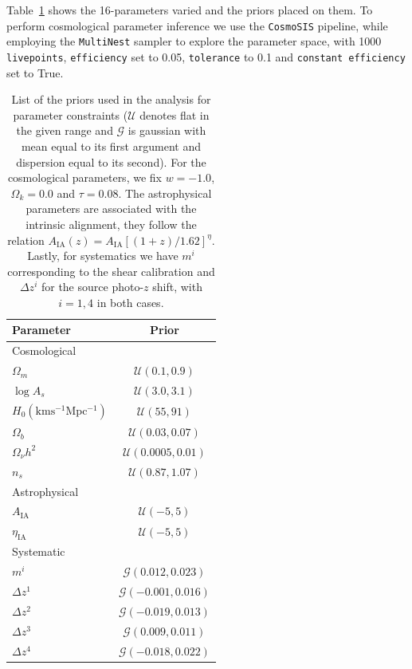\documentclass[twocolumn]{\docclass}
\begin{document}
	Table~\ref{tab:priors} shows the 16-parameters varied and the priors placed on them. To perform cosmological parameter inference we use the {\tt CosmoSIS} \citep{Zuntz:2015med, Lewis:2000taj, Kirk:2012mnras, Kilbinger:2009aa, Howlett:2012jcap, Bridle:2007njp, Takahashi:2012taj, Smith:2003mnras} pipeline, while employing the {\tt MultiNest} \citep{Feroz:2009fhb} sampler to explore the parameter space, with 1000 {\tt livepoints}, {\tt efficiency} set to 0.05, {\tt tolerance} to 0.1 and {\tt constant efficiency} set to True.
	
	\begin{table}
	\centering
	\begin{tabular} { l c} 
		\hline
		\hline
		Parameter		& Prior	\\ \hline
		Cosmological    & \\ [1ex]
		$\Omega_m$      & $\mathcal{U}(0.1, 0.9)$ \\
		$\log A_s$      & $\mathcal{U}(3.0, 3.1)$ \\
		$H_0 \mathrm{(km s^{-1} Mpc^{-1})}$	& $\mathcal{U}(55, 91)$\\
		$\Omega_b$      & $\mathcal{U}(0.03, 0.07)$ \\
		$\Omega_\nu h^2$& $\mathcal{U}(0.0005, 0.01)$ \\
		$n_s$           & $\mathcal{U}(0.87, 1.07)$ \\ [1ex]
		\hline
		Astrophysical       & \\ [1ex]
		$A_{\mathrm{IA}}$	& $\mathcal{U}(-5, 5)$ \\
		$\eta_{\mathrm{IA}}$& $\mathcal{U}(-5, 5)$ \\ [1ex]
		\hline
		Systematic      & \\ [1ex]
		$m^i$			& $\mathcal{G}(0.012, 0.023)$ \\
		$\Delta z^1$	& $\mathcal{G}(-0.001, 0.016)$ \\
		$\Delta z^2$	& $\mathcal{G}(-0.019, 0.013)$ \\
		$\Delta z^3$	& $\mathcal{G}(0.009, 0.011)$ \\
		$\Delta z^4$	& $\mathcal{G}(-0.018, 0.022)$ \\ [1ex]
		\hline
		\hline
	\end{tabular}
	\caption{List of the priors used in the analysis for parameter constraints ($\mathcal{U}$ denotes flat in the given range and $\mathcal{G}$ is gaussian with mean equal to its first argument and dispersion equal to its second). For the cosmological parameters, we fix $w = -1.0$, $\Omega_k =  0.0$ and $\tau =  0.08$. The astrophysical parameters are associated with the intrinsic alignment, they follow the relation $A_{\mathrm{IA}}(z) = A_{\mathrm{IA}}[(1+z)/1.62]^{\eta}$. Lastly, for systematics we have $m^i$ corresponding to the shear calibration and  $\Delta z^i$ for the source photo-$z$ shift, with $i = 1, 4$ in both cases.}
	\label{tab:priors}
	\end{table}
	
\end{document}
